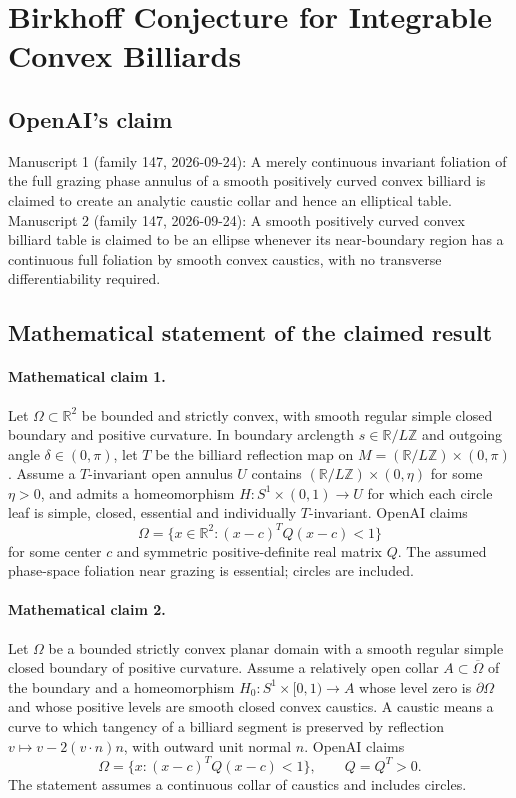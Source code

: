 \documentclass[11pt]{article}
\begin{document}
\section*{Birkhoff Conjecture for Integrable Convex Billiards}

\subsection{OpenAI's claim}
Manuscript 1 (family 147, 2026-09-24): A merely continuous invariant foliation of the full grazing phase annulus of a smooth positively curved convex billiard is claimed to create an analytic caustic collar and hence an elliptical table. Manuscript 2 (family 147, 2026-09-24): A smooth positively curved convex billiard table is claimed to be an ellipse whenever its near-boundary region has a continuous full foliation by smooth convex caustics, with no transverse differentiability required.

\subsection{Mathematical statement of the claimed result}
\paragraph{Mathematical claim 1.} Let $\Omega\subset\mathbb R^2$ be bounded and strictly convex, with smooth regular simple closed boundary and positive curvature. In boundary arclength $s\in\mathbb R/L\mathbb Z$ and outgoing angle $\delta\in(0,\pi)$, let $T$ be the billiard reflection map on $M=(\mathbb R/L\mathbb Z)\times(0,\pi)$. Assume a $T$-invariant open annulus $U$ contains $(\mathbb R/L\mathbb Z)\times(0,\eta)$ for some $\eta>0$, and admits a homeomorphism $H:S^1\times(0,1)\to U$ for which each circle leaf is simple, closed, essential and individually $T$-invariant. OpenAI claims
\[
\Omega=\{x\in\mathbb R^2:(x-c)^TQ(x-c)<1\}
\]
for some center $c$ and symmetric positive-definite real matrix $Q$. The assumed phase-space foliation near grazing is essential; circles are included.

\paragraph{Mathematical claim 2.} Let $\Omega$ be a bounded strictly convex planar domain with a smooth regular simple closed boundary of positive curvature. Assume a relatively open collar $A\subset\overline\Omega$ of the boundary and a homeomorphism $H_0:S^1\times[0,1)\to A$ whose level zero is $\partial\Omega$ and whose positive levels are smooth closed convex caustics. A caustic means a curve to which tangency of a billiard segment is preserved by reflection $v\mapsto v-2(v\cdot n)n$, with outward unit normal $n$. OpenAI claims
\[
\Omega=\{x:(x-c)^TQ(x-c)<1\},\qquad Q=Q^T>0.
\]
The statement assumes a continuous collar of caustics and includes circles.
\end{document}
